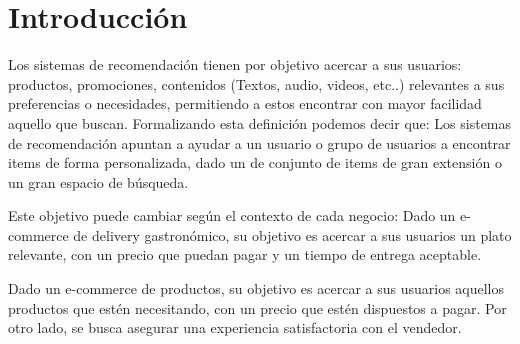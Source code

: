 \documentclass[11pt,a4paper,twoside]{thesis}
\begin{document}

\def\autor{Adrian Norberto Marino}
\def\tituloTesis{Sistemas de Recomendación Colaborativos}
\def\runtitulo{Resumen}
\def\runtitle{Sistemas de Recomendación Colaborativos}



\def\lugar{Buenos Aires, 2022}


%
\frontmatter
\pagestyle{empty}

%
%
\cleardoublepage
%
%
%
\tableofcontents
%
%
\mainmatter
\pagestyle{headings}
%
%
%
%


\chapter{Introducción}

Los sistemas de recomendación tienen por objetivo acercar a sus usuarios: productos, promociones, contenidos (Textos,  audio, videos, etc..) relevantes a sus preferencias o necesidades, permitiendo a estos encontrar con mayor facilidad aquello que buscan. Formalizando esta definición podemos decir que: Los sistemas de recomendación apuntan a ayudar a un usuario o grupo de usuarios a encontrar items de forma personalizada, dado un de conjunto de items de gran extensión o un gran espacio de búsqueda.

Este objetivo puede cambiar según el contexto de cada negocio: Dado un e-commerce de delivery gastronómico, su objetivo es acercar a sus usuarios un plato relevante, con un precio que puedan pagar y un tiempo de entrega aceptable. 

Dado un e-commerce de productos, su objetivo es acercar a sus usuarios aquellos productos que estén necesitando, con un precio que estén dispuestos a pagar. Por otro lado, se busca asegurar una experiencia satisfactoria con el vendedor.
\end{document}

